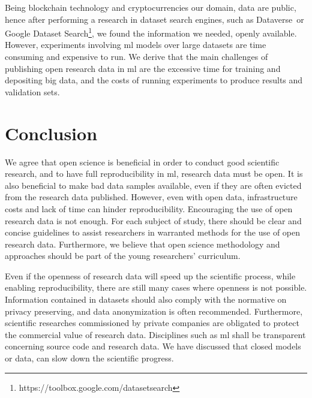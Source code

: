 Being blockchain technology and cryptocurrencies our domain,
data are public, hence after performing a research in dataset search engines, such as
Dataverse\,\cite{crosas2011dataverse} or Google Dataset
Search\footnote{https://toolbox.google.com/datasetsearch},
we found the information we needed, openly available. However, experiments involving \ac{ml} models
over large datasets are time consuming and expensive to run. We derive that the main
challenges of publishing open research data in \ac{ml} are the excessive time for training and
depositing big data, and the costs of running experiments to produce results and validation sets.

\section{Conclusion}
We agree that open science is beneficial in order to conduct good scientific research,
and to have full reproducibility in \ac{ml}, research data must be open.
It is also beneficial to make bad data samples available, even if
they are often evicted from the research data published.
However, even with open data, infrastructure costs and lack of time can hinder reproducibility.
Encouraging the use of open research data is not enough. For each subject of study,
there should be clear and concise guidelines to assist researchers in warranted methods for
the use of open research data.
Furthermore, we believe that open science methodology and approaches should
be part of the young researchers' curriculum.

Even if the openness of research data will speed up the scientific process,
while enabling reproducibility, there are still many cases where openness is not
possible.
Information contained in datasets should also comply with the normative on privacy preserving,
and data anonymization is often recommended. Furthermore, scientific researches
commissioned by private companies are obligated to protect the commercial value
of research data.
Disciplines such as \ac{ml} shall be transparent concerning source code
and research data. We have discussed that closed models or data, can slow
down the scientific progress.



